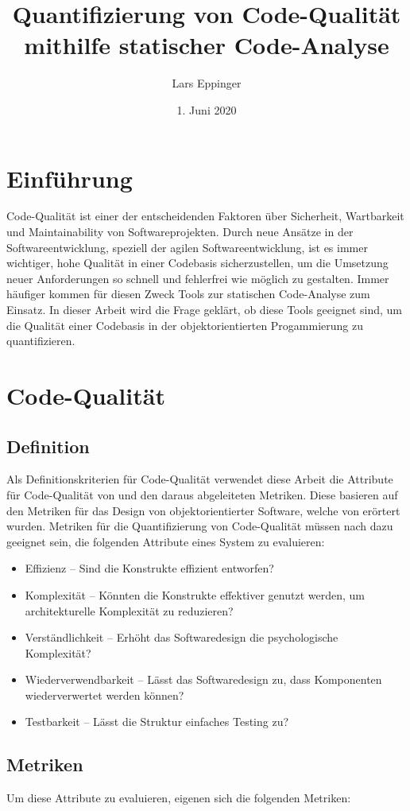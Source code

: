 \documentclass[a4paper, 12pt]{article}
\author{Lars Eppinger}
\title{Quantifizierung von Code-Qualität mithilfe statischer Code-Analyse}
\date{1. Juni 2020}
\begin{document}

\tableofcontents
\newpage

\section{Einführung}
Code-Qualität ist einer der entscheidenden Faktoren über Sicherheit, Wartbarkeit und Maintainability von Softwareprojekten. 
Durch neue Ansätze in der Softwareentwicklung, speziell der agilen Softwareentwicklung, ist es immer wichtiger, hohe Qualität in einer Codebasis sicherzustellen, um die Umsetzung neuer Anforderungen so schnell und fehlerfrei wie möglich zu gestalten.
Immer häufiger kommen für diesen Zweck Tools zur statischen Code-Analyse zum Einsatz.
In dieser Arbeit wird die Frage geklärt, ob diese Tools geeignet sind, um die Qualität einer Codebasis in der objektorientierten Progammierung zu quantifizieren.

\section{Code-Qualität}
\subsection{Definition}
Als Definitionskriterien für Code-Qualität verwendet diese Arbeit die Attribute für Code-Qualität von \textcite{Linda_softwarequality} und den daraus abgeleiteten Metriken.
Diese basieren auf den Metriken für das Design von objektorientierter Software, welche von \textcite{Metrics_OO_design} erörtert wurden.
Metriken für die Quantifizierung von Code-Qualität müssen nach \textcite{Linda_softwarequality} dazu geeignet sein, die folgenden Attribute eines System zu evaluieren:
\begin{itemize}
    \item Effizienz -- Sind die Konstrukte effizient entworfen?
    \item Komplexität -- Könnten die Konstrukte effektiver genutzt werden, um architekturelle Komplexität zu reduzieren?
    \item Verständlichkeit -- Erhöht das Softwaredesign die psychologische Komplexität?
    \item Wiederverwendbarkeit -- Lässt das Softwaredesign zu, dass Komponenten wiederverwertet werden können?
    \item Testbarkeit -- Lässt die Struktur einfaches Testing zu?
\end{itemize}
\subsection{Metriken}
Um diese Attribute zu evaluieren, eigenen sich die folgenden Metriken:
\end{document}
